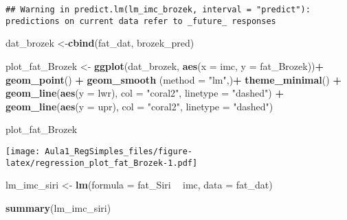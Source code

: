 \documentclass[]{article}
\newenvironment{Shaded}{\begin{snugshade}}{\end{snugshade}}
\newcommand{\DataTypeTok}[1]{\textcolor[rgb]{0.13,0.29,0.53}{#1}}
\newcommand{\KeywordTok}[1]{\textcolor[rgb]{0.13,0.29,0.53}{\textbf{#1}}}
\newcommand{\NormalTok}[1]{#1}
\newcommand{\OperatorTok}[1]{\textcolor[rgb]{0.81,0.36,0.00}{\textbf{#1}}}
\newcommand{\StringTok}[1]{\textcolor[rgb]{0.31,0.60,0.02}{#1}}
\begin{document}
\begin{verbatim}
## Warning in predict.lm(lm_imc_brozek, interval = "predict"): predictions on current data refer to _future_ responses
\end{verbatim}

\begin{Shaded}
\begin{Highlighting}[]
\NormalTok{dat_brozek <-}\KeywordTok{cbind}\NormalTok{(fat_dat, brozek_pred)}
\end{Highlighting}
\end{Shaded}

\begin{Shaded}
\begin{Highlighting}[]
\NormalTok{plot_fat_Brozek <-}\StringTok{ }\KeywordTok{ggplot}\NormalTok{(dat_brozek, }\KeywordTok{aes}\NormalTok{(}\DataTypeTok{x =}\NormalTok{ imc, }\DataTypeTok{y =}\NormalTok{ fat_Brozek))}\OperatorTok{+}
\StringTok{  }\KeywordTok{geom_point}\NormalTok{() }\OperatorTok{+}\StringTok{ }
\StringTok{  }\KeywordTok{geom_smooth}\NormalTok{ (}\DataTypeTok{method =} \StringTok{"lm"}\NormalTok{,)}\OperatorTok{+}
\StringTok{  }\KeywordTok{theme_minimal}\NormalTok{() }\OperatorTok{+}
\StringTok{  }\KeywordTok{geom_line}\NormalTok{(}\KeywordTok{aes}\NormalTok{(}\DataTypeTok{y =}\NormalTok{ lwr), }\DataTypeTok{col =} \StringTok{"coral2"}\NormalTok{, }\DataTypeTok{linetype =} \StringTok{"dashed"}\NormalTok{) }\OperatorTok{+}\StringTok{   }\KeywordTok{geom_line}\NormalTok{(}\KeywordTok{aes}\NormalTok{(}\DataTypeTok{y =}\NormalTok{ upr), }\DataTypeTok{col =} \StringTok{"coral2"}\NormalTok{, }\DataTypeTok{linetype =} \StringTok{"dashed"}\NormalTok{)}

\NormalTok{plot_fat_Brozek}
\end{Highlighting}
\end{Shaded}

\texttt{[image: Aula1\_RegSimples\_files/figure-latex/regression\_plot\_fat\_Brozek-1.pdf]}

\begin{Shaded}
\begin{Highlighting}[]
\NormalTok{lm_imc_siri <-}\StringTok{ }\KeywordTok{lm}\NormalTok{(}\DataTypeTok{formula =}\NormalTok{ fat_Siri  }\OperatorTok{~}\StringTok{ }\NormalTok{imc,}
                    \DataTypeTok{data =}\NormalTok{ fat_dat)}

\KeywordTok{summary}\NormalTok{(lm_imc_siri)}
\end{Highlighting}
\end{Shaded}
\end{document}
